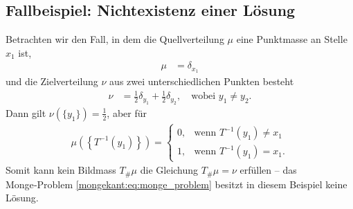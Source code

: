 \subsection{Fallbeispiel: Nichtexistenz einer Lösung%
\label{mongekant:subsection:monge_inexistence}}
Betrachten wir den Fall,
in dem die Quellverteilung $\mu$ eine Punktmasse an Stelle $x_1$ ist,
\begin{align*}
\mu
&=
\delta_{x_1}
\end{align*}
und die Zielverteilung $\nu$ aus zwei unterschiedlichen Punkten besteht
\begin{align*}
\nu
&=
\frac{1}{2} \delta_{y_1} + \frac{1}{2} \delta_{y_2}
,\quad
\text{wobei } y_1 \neq y_2
.
\end{align*}
Dann gilt $\nu(\{y_1\}) = \frac{1}{2}$,
aber für
\begin{align*}
\mu\left(\left\{T^{-1}(y_1)\right\}\right)
=
\begin{cases}
0,
&\text{wenn }
T^{-1}(y_1)
\neq
x_1
\\
1,
&\text{wenn }
T^{-1}(y_1)
=
x_1
.
\end{cases}
\end{align*}
Somit kann kein Bildmass $T_{\#}\mu$ die Gleichung $T_{\#}\mu=\nu$ erfüllen --
das Monge‑Problem \eqref{mongekant:eq:monge_problem}
besitzt in diesem Beispiel keine Lösung.


